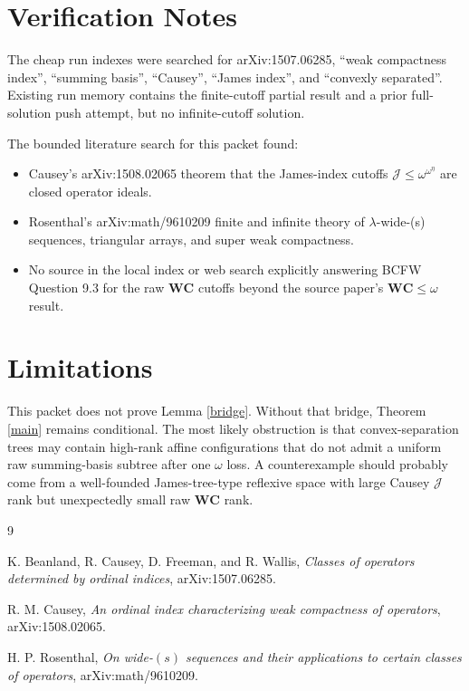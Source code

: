 \documentclass[11pt]{article}
\theoremstyle{definition}
\newcommand{\WC}{\mathbf{WC}}
\newcommand{\J}{\mathcal{J}}
\begin{document}
\section{Verification Notes}

The cheap run indexes were searched for arXiv:1507.06285, ``weak compactness
index'', ``summing basis'', ``Causey'', ``James index'', and ``convexly
separated''.  Existing run memory contains the finite-cutoff partial result
and a prior full-solution push attempt, but no infinite-cutoff solution.

The bounded literature search for this packet found:
\begin{itemize}[leftmargin=2em]
  \item Causey's arXiv:1508.02065 theorem that the James-index cutoffs
  $\J\leq\omega^{\omega^\eta}$ are closed operator ideals.
  \item Rosenthal's arXiv:math/9610209 finite and infinite theory of
  $\lambda$-wide-(s) sequences, triangular arrays, and super weak compactness.
  \item No source in the local index or web search explicitly answering BCFW
  Question 9.3 for the raw $\WC$ cutoffs beyond the source paper's
  $\WC\leq\omega$ result.
\end{itemize}

\section{Limitations}

This packet does not prove Lemma \ref{bridge}.  Without that bridge, Theorem
\ref{main} remains conditional.  The most likely obstruction is that
convex-separation trees may contain high-rank affine configurations that do
not admit a uniform raw summing-basis subtree after one $\omega$ loss.  A
counterexample should probably come from a well-founded James-tree-type
reflexive space with large Causey $\J$ rank but unexpectedly small raw $\WC$
rank.

\begin{thebibliography}{9}

K. Beanland, R. Causey, D. Freeman, and R. Wallis,
\emph{Classes of operators determined by ordinal indices},
arXiv:1507.06285.

R. M. Causey,
\emph{An ordinal index characterizing weak compactness of operators},
arXiv:1508.02065.

H. P. Rosenthal,
\emph{On wide-$(s)$ sequences and their applications to certain classes of
operators},
arXiv:math/9610209.

\end{thebibliography}
\end{document}
